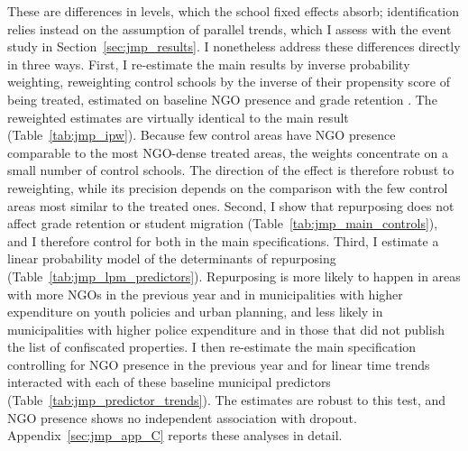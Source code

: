 \documentclass[12pt]{article}
\theoremstyle{plain}
\theoremstyle{plain}
\theoremstyle{plain}
\theoremstyle{definition}
\theoremstyle{plain}
\theoremstyle{definition}
\theoremstyle{plain}
\theoremstyle{remark}
\theoremstyle{definition}
\theoremstyle{definition}
\theoremstyle{plain}
\begin{document}
These are differences in levels, which the school fixed effects absorb; identification relies instead on the assumption of parallel trends, which I assess with the event study in Section~\ref{sec:jmp_results}. I nonetheless address these differences directly in three ways. First, I re-estimate the main results by inverse probability weighting, reweighting control schools by the inverse of their propensity score of being treated, estimated on baseline NGO presence and grade retention \citep{hirano_efficient_2003}. The reweighted estimates are virtually identical to the main result (Table~\ref{tab:jmp_ipw}). Because few control areas have NGO presence comparable to the most NGO-dense treated areas, the weights concentrate on a small number of control schools. The direction of the effect is therefore robust to reweighting, while its precision depends on the comparison with the few control areas most similar to the treated ones. Second, I show that repurposing does not affect grade retention or student migration (Table~\ref{tab:jmp_main_controls}), and I therefore control for both in the main specifications. Third, I estimate a linear probability model of the determinants of repurposing (Table~\ref{tab:jmp_lpm_predictors}). Repurposing is more likely to happen in areas with more NGOs in the previous year and in municipalities with higher expenditure on youth policies and urban planning, and less likely in municipalities with higher police expenditure and in those that did not publish the list of confiscated properties. I then re-estimate the main specification controlling for NGO presence in the previous year and for linear time trends interacted with each of these baseline municipal predictors (Table~\ref{tab:jmp_predictor_trends}). The estimates are robust to this test, and NGO presence shows no independent association with dropout. Appendix~\ref{sec:jmp_app_C} reports these analyses in detail.
\end{document}
